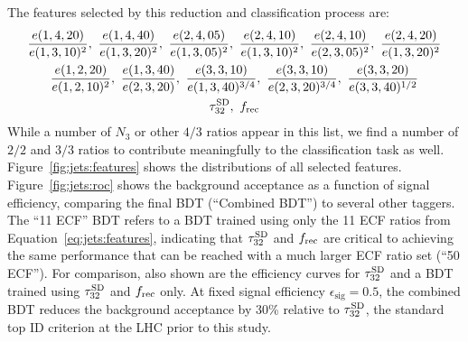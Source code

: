 The features selected by this reduction and classification process are:
\begin{gather}
    \frac{e(1,4,20)}{e(1,3,10)^2},~
    \frac{e(1,4,40)}{e(1,3,20)^2},~
    \frac{e(2,4,05)}{e(1,3,05)^2},~
    \frac{e(2,4,10)}{e(1,3,10)^2},~
    \frac{e(2,4,10)}{e(2,3,05)^2},~
    \frac{e(2,4,20)}{e(1,3,20)^2} \nonumber \\ 
    \frac{e(1,2,20)}{e(1,2,10)^2},~
    \frac{e(1,3,40)}{e(2,3,20)},~
    \frac{e(3,3,10)}{e(1,3,40)^{3/4}},~
    \frac{e(3,3,10)}{e(2,3,20)^{3/4}},~
    \frac{e(3,3,20)}{e(3,3,40)^{1/2}}\nonumber \\ 
    \tau_{32}^{\mathrm{SD}},~ f_\mathrm{rec} 
    \label{eq:jets:features}
\end{gather}
While a number of $N_3$ or other $4/3$ ratios appear in this list, we find a number of $2/2$ and $3/3$ ratios to contribute meaningfully to the classification task as well. 
Figure~\ref{fig:jets:features} shows the distributions of all selected features. 
Figure~\ref{fig:jets:roc} shows the background acceptance as a function of signal efficiency, comparing the final BDT (``Combined BDT'') to several other taggers.
The ``11 ECF'' BDT refers to a BDT trained using only the 11 ECF ratios from Equation~\ref{eq:jets:features}, indicating that $\tau_{32}^{\mathrm{SD}}$ and $f_\mathrm{rec}$ are critical to achieving the same performance that can be reached with a much larger ECF ratio set (``50 ECF'').
For comparison, also shown are the efficiency curves for $\tau_{32}^{\mathrm{SD}}$ and a BDT trained using $\tau_{32}^{\mathrm{SD}}$ and $f_\mathrm{rec}$ only.
At fixed signal efficiency $\epsilon_\mathrm{sig} = 0.5$, the combined BDT reduces the background acceptance by 30\% relative to $\tau_{32}^{\mathrm{SD}}$, the standard top ID criterion at the LHC prior to this study. 

